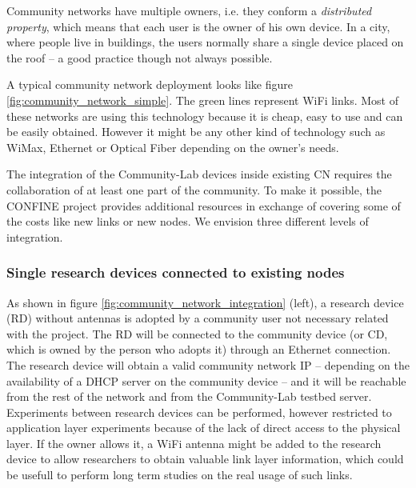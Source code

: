 \documentclass[conference]{IEEEtran}
\begin{document}
Community networks have multiple owners, i.e. they conform a \textit{distributed property}, 
which means that each user is the owner of his own device. In a city, where people live in 
buildings, the users normally share a single device placed on the roof -- a good practice though
not always possible.

A typical community network deployment looks like figure \ref{fig:community_network_simple}.
The green lines represent WiFi links. Most of these networks are using this technology because 
it is cheap, easy to use and can be easily obtained. However it might be any other kind of technology 
such as WiMax, Ethernet or Optical Fiber depending on the owner's needs.


The integration of the Community-Lab devices inside existing CN requires the collaboration of at least
one part of the community. To make it possible, the CONFINE project provides additional resources in exchange
of covering some of the costs like new links or new nodes. We envision three different levels of integration.

\subsubsection{Single research devices connected to existing nodes}
\label{sec:single-research-devices}

As shown in figure \ref{fig:community_network_integration} (left), a research device (RD) without antennas is 
adopted by a community user not necessary related with the project.
The RD will be connected to the community device (or CD, which is owned by the person who adopts it) through an Ethernet connection. 
The research device will obtain a valid community network IP -- depending on the availability of a DHCP server on the community device --
and it will be reachable from the rest of the network and from the Community-Lab testbed server.
Experiments between research devices can be performed, however restricted to application layer experiments because of the 
lack of direct access to the physical layer. If the owner allows it, a WiFi antenna might be 
added to the research device to allow researchers to obtain valuable link layer information, which could
be usefull to perform long term studies on the real usage of such links.
\end{document}
